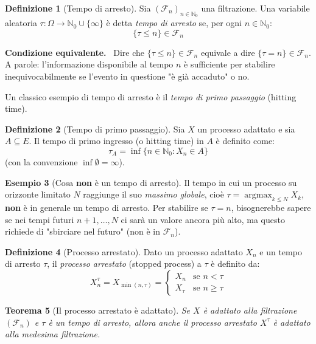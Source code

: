 \documentclass[11pt, a4paper]{report}
\theoremstyle{plain}
\newtheorem{theorem}{Teorema}[chapter]
\theoremstyle{definition}
\newtheorem{definition}[theorem]{Definizione}
\newtheorem{esempio}[theorem]{Esempio}
\theoremstyle{remark}
\newenvironment{hint}[1][Hint]
{\begin{mdframed}[backgroundcolor=blue!5, linecolor=blue!50, linewidth=2pt, topline=false, rightline=false, bottomline=false]
\textbf{\textsf{#1.}}\ }
{\end{mdframed}}
\newcommand{\F}{\mathcal{F}}
\newcommand{\N}{\mathbb{N}}
\newcommand{\1}{\mathbf{1}}
\begin{document}
\begin{definition}[Tempo di arresto]
Sia $(\F_n)_{n \in \N_0}$ una filtrazione. Una variabile aleatoria $\tau : \Omega \to \N_0 \cup \{\infty\}$ è detta \emph{tempo di arresto} se, per ogni $n \in \N_0$:
\[ \{\tau \le n\} \in \F_n \]
\end{definition}

\begin{hint}[Condizione equivalente]
Dire che $\{\tau \le n\} \in \F_n$ equivale a dire $\{\tau = n\} \in \F_n$.
A parole: l'informazione disponibile al tempo $n$ è sufficiente per stabilire inequivocabilmente se l'evento in questione "è già accaduto" o no.
\end{hint}

Un classico esempio di tempo di arresto è il \emph{tempo di primo passaggio} (hitting time).

\begin{definition}[Tempo di primo passaggio]
Sia $X$ un processo adattato e sia $A \subseteq E$. Il tempo di primo ingresso (o hitting time) in $A$ è definito come:
\[ \tau_A = \inf\{n \in \N_0 : X_n \in A\} \]
(con la convenzione $\inf \emptyset = \infty$).
\end{definition}

\begin{esempio}[Cosa \textbf{non} è un tempo di arresto]
Il tempo in cui un processo su orizzonte limitato $N$ raggiunge il suo \emph{massimo globale}, cioè $\tau = \operatorname{argmax}_{k \le N} X_k$, \textbf{non} è in generale un tempo di arresto. Per stabilire se $\tau = n$, bisognerebbe sapere se nei tempi futuri $n+1, \dots, N$ ci sarà un valore ancora più alto, ma questo richiede di "sbirciare nel futuro" (non è in $\F_n$).
\end{esempio}

\begin{definition}[Processo arrestato]
Dato un processo adattato $X_n$ e un tempo di arresto $\tau$, il \emph{processo arrestato} (stopped process) a $\tau$ è definito da:
\[ X_n^\tau = X_{\min(n, \tau)} = \begin{cases}
X_n & \text{se } n < \tau \\
X_\tau & \text{se } n \ge \tau
\end{cases} \]
\end{definition}

\begin{theorem}[Il processo arrestato è adattato]
Se $X$ è adattato alla filtrazione $(\F_n)$ e $\tau$ è un tempo di arresto, allora anche il processo arrestato $X^\tau$ è adattato alla medesima filtrazione.
\end{theorem}
\end{document}
